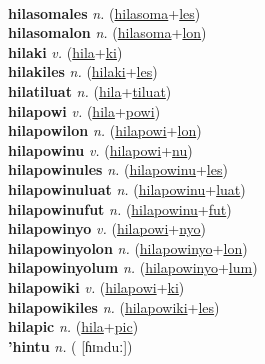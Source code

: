  \label{hilasoma} \\
\textbf{hilasomales} \textit{n.} (\hyperref[hilasoma]{hilasoma}+\hyperref[les]{les})
 \label{hilasomales} \\
\textbf{hilasomalon} \textit{n.} (\hyperref[hilasoma]{hilasoma}+\hyperref[lon]{lon})
 \label{hilasomalon} \\
\textbf{hilaki} \textit{v.} (\hyperref[hila]{hila}+\hyperref[ki]{ki})
 \label{hilaki} \\
\textbf{hilakiles} \textit{n.} (\hyperref[hilaki]{hilaki}+\hyperref[les]{les})
 \label{hilakiles} \\
\textbf{hilatiluat} \textit{n.} (\hyperref[hila]{hila}+\hyperref[tiluat]{tiluat})
 \label{hilatiluat} \\
\textbf{hilapowi} \textit{v.} (\hyperref[hila]{hila}+\hyperref[powi]{powi})
 \label{hilapowi} \\
\textbf{hilapowilon} \textit{n.} (\hyperref[hilapowi]{hilapowi}+\hyperref[lon]{lon})
 \label{hilapowilon} \\
\textbf{hilapowinu} \textit{v.} (\hyperref[hilapowi]{hilapowi}+\hyperref[nu]{nu})
 \label{hilapowinu} \\
\textbf{hilapowinules} \textit{n.} (\hyperref[hilapowinu]{hilapowinu}+\hyperref[les]{les})
 \label{hilapowinules} \\
\textbf{hilapowinuluat} \textit{n.} (\hyperref[hilapowinu]{hilapowinu}+\hyperref[luat]{luat})
 \label{hilapowinuluat} \\
\textbf{hilapowinufut} \textit{n.} (\hyperref[hilapowinu]{hilapowinu}+\hyperref[fut]{fut})
 \label{hilapowinufut} \\
\textbf{hilapowinyo} \textit{v.} (\hyperref[hilapowi]{hilapowi}+\hyperref[nyo]{nyo})
 \label{hilapowinyo} \\
\textbf{hilapowinyolon} \textit{n.} (\hyperref[hilapowinyo]{hilapowinyo}+\hyperref[lon]{lon})
 \label{hilapowinyolon} \\
\textbf{hilapowinyolum} \textit{n.} (\hyperref[hilapowinyo]{hilapowinyo}+\hyperref[lum]{lum})
 \label{hilapowinyolum} \\
\textbf{hilapowiki} \textit{v.} (\hyperref[hilapowi]{hilapowi}+\hyperref[ki]{ki})
 \label{hilapowiki} \\
\textbf{hilapowikiles} \textit{n.} (\hyperref[hilapowiki]{hilapowiki}+\hyperref[les]{les})
 \label{hilapowikiles} \\
\textbf{hilapic} \textit{n.} (\hyperref[hila]{hila}+\hyperref[pic]{pic})
 \label{hilapic} \\
\textbf{'hintu} \textit{n.} ( [ɦɪnduː])
